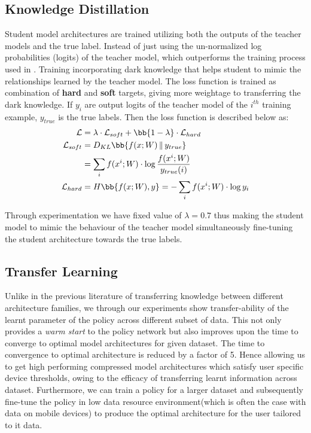 \documentclass[../main]{subfiles}
\begin{document}
    \subsection{Knowledge Distillation}
        Student model architectures are trained utilizing both the outputs of the teacher models and the true label.
        Instead of just using the un-normalized log probabilities (logits) of the teacher model, which outperforms the training process used in \cite{ashok2017n2n}.
        Training incorporating dark knowledge \cite{hinton2015distilling} that helps student to mimic the relationships learned by the teacher model.
        The loss function is trained as combination of \textbf{hard} and \textbf{soft} targets, giving more weightage to transferring the dark knowledge.
        If $y_{i}$ are output logits of the teacher model of the $i^{th}$ training example, $y_{true}$ is the true labels.
        Then the loss function is described below as:
        \begin{align}
            \mathcal{L} & = \lambda\cdot\mathcal{L}_{soft} + \bb{1-\lambda}\cdot\mathcal{L}_{hard}   \\
            \mathcal{L}_{soft} & = D_{KL}\bb{f(x; W) \,\Vert\, y_{true}}    \notag \\
            & = \sum_{i} f(x^{i}; W) \cdot \log\frac{f(x^{i}; W)}{y_{true}(i)}   \\
            \mathcal{L}_{hard} & = H\bb{f(x; W), y} = - \sum_{i} f(x^{i}; W) \cdot \log{y_{i}}
        \end{align}
        
        Through experimentation we have fixed value of $\lambda = 0.7$ thus making the student model to mimic the behaviour of the teacher model simultaneously fine-tuning the student architecture towards the true labels.

    \subsection{Transfer Learning}
        Unlike in the previous literature \cite{ashok2017n2n,zoph2017learning} of transferring knowledge between different architecture families, we through our experiments show transfer-ability of the learnt parameter of the policy across different subset of data.
        This not only provides a \textit{warm start} to the policy network but also improves upon the time to converge to optimal model architectures for given dataset.
        The time to convergence to optimal architecture is reduced by a factor of 5.
        Hence allowing us to get high performing compressed model architectures which satisfy user specific device thresholds, owing to the efficacy of transferring learnt information across dataset.
        Furthermore, we can train a policy for a larger dataset and subsequently fine-tune the policy in low data resource environment(which is often the case with data on mobile devices) to produce the optimal architecture for the user tailored to it data.

\end{document}
